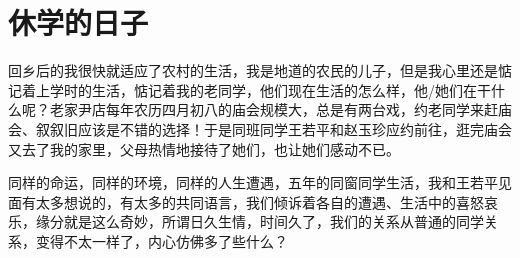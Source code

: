 \chapter{休学的日子}

回乡后的我很快就适应了农村的生活，我是地道的农民的儿子，但是我心里还是惦记着上学时的生活，惦记着我的老同学，他们现在生活的怎么样，他/她们在干什么呢？老家尹店每年农历四月初八的庙会规模大，总是有两台戏，约老同学来赶庙会、叙叙旧应该是不错的选择！于是同班同学王若平和赵玉珍应约前往，逛完庙会又去了我的家里，父母热情地接待了她们，也让她们感动不已。

同样的命运，同样的环境，同样的人生遭遇，五年的同窗同学生活，我和王若平见面有太多想说的，有太多的共同语言，我们倾诉着各自的遭遇、生活中的喜怒哀乐，缘分就是这么奇妙，所谓日久生情，时间久了，我们的关系从普通的同学关系，变得不太一样了，内心仿佛多了些什么？

